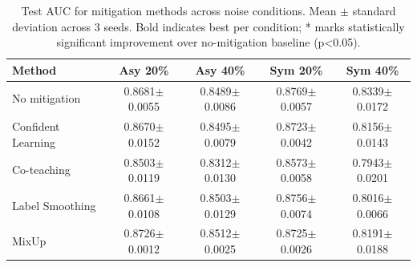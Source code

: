 \begin{table}[h]
\centering
\small
\caption{Test AUC for mitigation methods across noise conditions. Mean $\pm$ standard deviation across 3 seeds. Bold indicates best per condition; * marks statistically significant improvement over no-mitigation baseline (p<0.05).}
\label{tab:mitigation_results}
\begin{tabular}{lcccc}
\toprule
Method & Asy 20\% & Asy 40\% & Sym 20\% & Sym 40\% \\
\midrule
No mitigation & 0.8681$\pm$0.0055 & 0.8489$\pm$0.0086 & 0.8769$\pm$0.0057 & 0.8339$\pm$0.0172 \\
\midrule
Confident Learning & 0.8670$\pm$0.0152 & 0.8495$\pm$0.0079 & 0.8723$\pm$0.0042 & 0.8156$\pm$0.0143 \\
Co-teaching & 0.8503$\pm$0.0119 & 0.8312$\pm$0.0130 & 0.8573$\pm$0.0058 & 0.7943$\pm$0.0201 \\
Label Smoothing & 0.8661$\pm$0.0108 & 0.8503$\pm$0.0129 & 0.8756$\pm$0.0074 & 0.8016$\pm$0.0066 \\
MixUp & 0.8726$\pm$0.0012 & 0.8512$\pm$0.0025 & 0.8725$\pm$0.0026 & 0.8191$\pm$0.0188 \\
\bottomrule
\end{tabular}
\end{table}